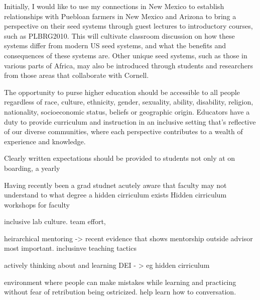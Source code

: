 \documentclass[11pt]{article}
\begin{document}


Initially, I would like to use my connections in New Mexico to establish relationships with Puebloan farmers in New Mexico and Arizona to bring a perspective on their seed systems through guest lectures to introductory courses, such as PLBRG2010. This will cultivate classroom discussion on how these systems differ from modern US seed systems, and what the benefits and consequences of these systems are. Other unique seed systems, such as those in various parts of Africa, may also be introduced through students and researchers from those areas that collaborate with Cornell. %


The opportunity to purse higher education should be accessible to all people regardless of race, culture, ethnicity, gender, sexuality, ability, disability, religion, nationality, socioeconomic status, beliefs or geographic origin. Educators have a duty to provide curriculum and instruction in an inclusive setting that's reflective of our diverse communities, where each perspective contributes to a wealth of experience and knowledge. %




Clearly written expectations should be provided to students not only at on boarding,  a yearly 


Having recently been a grad studnet acutely aware that faculty may not understand to what degree a hidden cirriculum exists
Hidden cirriculum workshops for faculty


inclusive lab culture. 
team effort, 

heirarchical mentoring -> recent evidence that shows mentorship outside advisor most important. 
inclusinve teaching tactics


actively thinking about and learning DEI - > eg hidden cirriculum 

environment where people can make mistakes while learning and practicing without fear of retribution being ostricized. help learn how to conversation.
 
\end{document}
